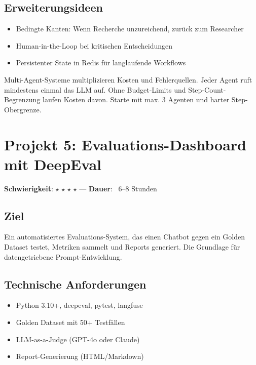 \subsection*{Erweiterungsideen}
\begin{itemize}[leftmargin=*]
    \item Bedingte Kanten: Wenn Recherche unzureichend, zurück zum Researcher
    \item Human-in-the-Loop bei kritischen Entscheidungen
    \item Persistenter State in Redis für langlaufende Workflows
\end{itemize}

\begin{praxishinweis}
Multi-Agent-Systeme multiplizieren Kosten und Fehlerquellen. Jeder Agent ruft mindestens einmal das LLM auf. Ohne Budget-Limits und Step-Count-Begrenzung laufen Kosten davon. Starte mit max. 3 Agenten und harter Step-Obergrenze.
\end{praxishinweis}

\section{Projekt 5: Evaluations-Dashboard mit DeepEval}

\textbf{Schwierigkeit}: $\star$ $\star$ $\star$ $\star$ ---
\textbf{Dauer}: ~6--8 Stunden

\subsection*{Ziel}
Ein automatisiertes Evaluations-System, das einen Chatbot gegen ein Golden Dataset testet, Metriken sammelt und Reports generiert. Die Grundlage für datengetriebene Prompt-Entwicklung.

\subsection*{Technische Anforderungen}
\begin{itemize}[leftmargin=*]
    \item Python 3.10+, deepeval, pytest, langfuse
    \item Golden Dataset mit 50+ Testfällen
    \item LLM-as-a-Judge (GPT-4o oder Claude)
    \item Report-Generierung (HTML/Markdown)
\end{itemize}

